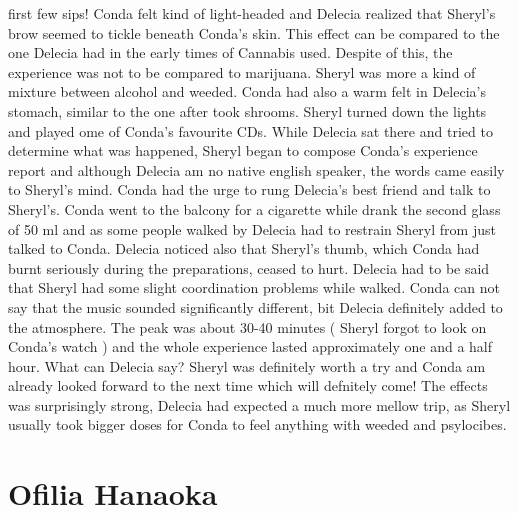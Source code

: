 \documentclass[12pt]{book}
\begin{document}
first few sips! Conda felt kind of light-headed and Delecia realized that Sheryl's brow seemed to tickle beneath Conda's skin. This effect can be compared to the one Delecia had in the early times of Cannabis used. Despite of this, the experience was not to be compared to marijuana. Sheryl was more a kind of mixture between alcohol and weeded. Conda had also a warm felt in Delecia's stomach, similar to the one after took shrooms. Sheryl turned down the lights and played ome of Conda's favourite CDs. While Delecia sat there and tried to determine what was happened, Sheryl began to compose Conda's experience report and although Delecia am no native english speaker, the words came easily to Sheryl's mind. Conda had the urge to rung Delecia's best friend and talk to Sheryl's. Conda went to the balcony for a cigarette while drank the second glass of 50 ml and as some people walked by Delecia had to restrain Sheryl from just talked to Conda. Delecia noticed also that Sheryl's thumb, which Conda had burnt seriously during the preparations, ceased to hurt. Delecia had to be said that Sheryl had some slight coordination problems while walked. Conda can not say that the music sounded significantly different, bit Delecia definitely added to the atmosphere. The peak was about 30-40 minutes ( Sheryl forgot to look on Conda's watch ) and the whole experience lasted approximately one and a half hour. What can Delecia say? Sheryl was definitely worth a try and Conda am already looked forward to the next time which will defnitely come! The effects was surprisingly strong, Delecia had expected a much more mellow trip, as Sheryl usually took bigger doses for Conda to feel anything with weeded and psylocibes.



\chapter{Ofilia Hanaoka}
\end{document}
